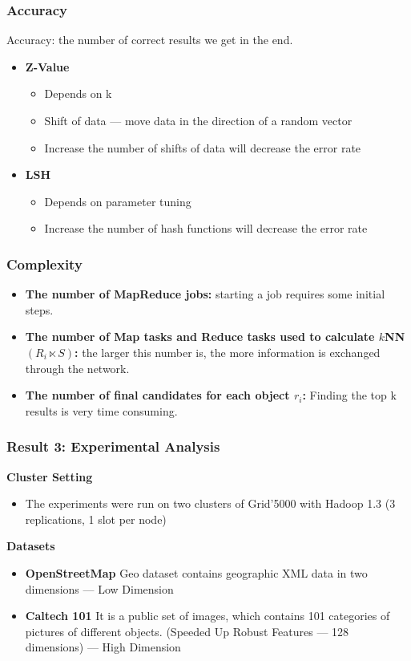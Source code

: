 \begin{frame}
\frametitle{Accuracy}
Accuracy: the number of correct results we get in the end.
\begin{itemize}
\item \textbf{Z-Value}
\begin{itemize}
\item Depends on k
\item Shift of data --- move data in the direction of a random vector
\item Increase the number of shifts of data will decrease the error rate
\end{itemize}
\item \textbf{LSH}
\begin{itemize}
\item Depends on parameter tuning
\item Increase the number of hash functions will decrease the error rate
\end{itemize}
\end{itemize}
\end{frame}


\begin{frame}
\frametitle{Complexity}

\begin{itemize}
\item \textbf{The number of MapReduce jobs: } starting a job requires some initial steps.

\item \textbf{The number of Map tasks and Reduce tasks used to calculate $k$NN$\left(R_i \ltimes S\right)$: } the larger this number is, the more information is exchanged through the network.

\item \textbf{The number of final candidates for each object $r_i$: }  Finding the top k results is very time consuming. 
\end{itemize}
\end{frame}


\begin{frame}
\frametitle{Result 3: Experimental Analysis}
\textbf{Cluster Setting}
\vspace{-0.1in}
\begin{itemize}
\item The experiments were run on two clusters of Grid'5000 with Hadoop 1.3 (3 replications, 1 slot per node)

\end{itemize}
\textbf{Datasets}
\vspace{-0.1in}
\begin{itemize}
\item \textbf{OpenStreetMap} Geo dataset contains geographic XML data in two dimensions  --- Low Dimension
\item \textbf{Caltech 101} It is a public set of images, which contains 101 categories of pictures of different objects. (Speeded Up Robust Features --- 128 dimensions) --- High Dimension
\end{itemize}
\end{frame}


